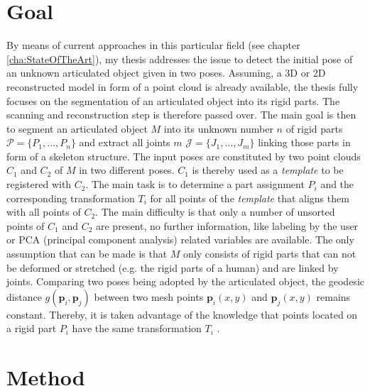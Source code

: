 \section{Goal}

By means of current approaches in this particular field (see chapter \ref{cha:StateOfTheArt}), my thesis addresses the issue to detect the initial pose of an unknown articulated object given in two poses.
Assuming, a 3D or 2D reconstructed model in form of a point cloud is already available, the thesis fully focuses on the segmentation of an articulated object into its rigid parts. The scanning and reconstruction step is therefore passed over. The main goal is then to segment an articulated object $M$ into its unknown number $n$ of rigid parts $\mathcal{P} =  \{P_1,\ldots,P_n\}$ and extract all joints $m$ $\mathcal{J} =  \{J_1,\ldots,J_m\}$ linking those parts in form of a skeleton structure. The input poses are constituted by two point clouds $C_1$ and $C_2$ of $M$ in two different poses. $C_1$ is thereby used as a \textit{template} to be registered with $C_2$. The main task is to determine a part assignment $P_i$ and the corresponding transformation $T_i$ for all points of the \textit{template} that aligns them with all points of $C_2$. The main difficulty is that only a number of unsorted points of $C_1$ and $C_2$ are present, no further information, like labeling by the user or PCA (principal component analysis) related variables are available. The only assumption that can be made is that $M$ only consists of rigid parts that can not be deformed or stretched (e.g. the rigid parts of a human) and are linked by joints. Comparing two poses being adopted by the articulated object, the geodesic distance $g(\boldsymbol{p}_i,\boldsymbol{p}_j)$ between two mesh points $\boldsymbol{p}_i(x,y)$ and $\boldsymbol{p}_j(x,y)$ remains constant. Thereby, it is taken advantage of the knowledge that points located on a rigid part $P_i$ have the same transformation $T_i$ .

\section{Method}


